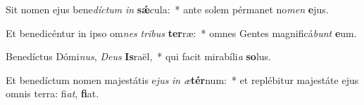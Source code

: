 \item Sit nomen ejus bene\textit{díc}\textit{tum} \textit{in} \textbf{sǽ}cula:~* ante solem pérmanet no\textit{men} \textbf{e}jus.
\item Et benedicéntur in ipso om\textit{nes} \textit{tri}\textit{bus} \textbf{ter}ræ:~* omnes Gentes magnificá\textit{bunt} \textbf{e}um.
\item Benedíctus Dómi\textit{nus}, \textit{De}\textit{us} \textbf{Is}raël,~* qui facit mirabíli\textit{a} \textbf{so}lus.
\item Et benedíctum nomen majestátis e\textit{jus} \textit{in} \textit{æ}\textbf{tér}num:~* et replébitur majestáte ejus omnis terra: fi\textit{at}, \textbf{fi}at.
